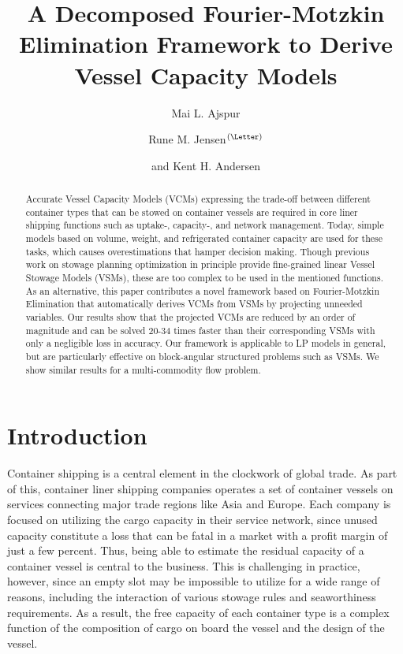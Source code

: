 \documentclass{llncs}
\begin{document}
\title{A Decomposed Fourier-Motzkin Elimination Framework to Derive Vessel Capacity Models}
\author{Mai L. Ajspur \and Rune M. Jensen$^{\text{(\Letter)}}$ \and and Kent H. Andersen}

\maketitle

\begin{abstract}
Accurate Vessel Capacity Models (VCMs) expressing the trade-off between different container types that can be stowed on container vessels are required in core liner shipping functions such as uptake-, capacity-, and network management. Today, simple models based on volume, weight, and refrigerated container capacity are used for these tasks, which causes overestimations that hamper decision making.
Though previous work on stowage planning optimization in principle provide fine-grained linear Vessel Stowage Models (VSMs), these are too complex to be used in the mentioned functions. As an alternative, this paper contributes a novel framework based on Fourier-Motzkin Elimination that automatically derives VCMs from VSMs by projecting unneeded variables. Our results show that the projected VCMs are reduced by an order of magnitude and can be solved 20-34 times faster than their corresponding VSMs with only a negligible loss in accuracy. 
Our framework is applicable to LP models in general, but are particularly effective on block-angular structured problems such as VSMs. We show similar results for a multi-commodity flow problem.
\end{abstract}
\section{Introduction}
Container shipping is a central element in the clockwork of global trade. %
As part of this, container liner shipping companies operates a set of container vessels on services connecting major trade regions like Asia and Europe. Each company is focused on utilizing the cargo capacity in their service network, since unused capacity constitute a loss that can be fatal in a market with a profit margin of just a few percent. Thus, being able to estimate the residual capacity of a container vessel is central to the business. 
This is challenging in practice, however, since an empty slot may be impossible to utilize for a wide range of reasons, including the interaction of various stowage rules and seaworthiness requirements. As a result, the free capacity of each container type is a complex function of the composition of cargo on board the vessel and the design of the vessel. 
\end{document}
